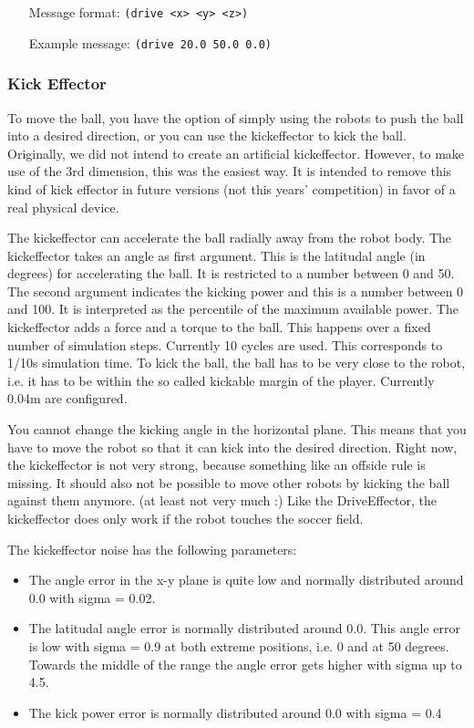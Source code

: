 \begin{itemize}
	\item[Message format:] \texttt{(drive <x> <y> <z>)}
	\item[Example message:] \texttt{(drive 20.0 50.0 0.0)}
\end{itemize}

\subsubsection{Kick Effector}
\label{sec:kickeffector}

To move the ball, you have the option of simply using the robots to
push the ball into a desired direction, or you can use the
kickeffector to kick the ball. Originally, we did not intend to create
an artificial kickeffector. However, to make use of the 3rd dimension,
this was the easiest way. It is intended to remove this kind of kick
effector in future versions (not this years' competition) in favor of
a real physical device.

The kickeffector can accelerate the ball radially away from the robot
body. The kickeffector takes an angle as first argument. This is the
latitudal angle (in degrees) for accelerating the ball. It is
restricted to a number between 0 and 50. The second argument indicates
the kicking power and this is a number between 0 and 100. It is
interpreted as the percentile of the maximum available power. The
kickeffector adds a force and a torque to the ball. This happens over
a fixed number of simulation steps. Currently 10 cycles are used. This
corresponds to 1/10s simulation time. To kick the ball, the ball has
to be very close to the robot, i.e. it has to be within the so called
kickable margin of the player. Currently 0.04m are configured.

You cannot change the kicking angle in the horizontal plane. This
means that you have to move the robot so that it can kick into the
desired direction. Right now, the kickeffector is not very strong,
because something like an offside rule is missing. It should also not
be possible to move other robots by kicking the ball against them
anymore. (at least not very much :) Like the DriveEffector, the
kickeffector does only work if the robot touches the soccer field.

The kickeffector noise has the following parameters: 
\begin{itemize}
\item The angle error in the x-y plane is quite low and normally distributed
around 0.0 with sigma = 0.02.
\item The latitudal angle error is normally distributed around 0.0. This
angle error is low with sigma = 0.9 at both extreme positions, i.e. 0
and at 50 degrees. Towards the middle of the range the angle error
gets higher with sigma up to 4.5.
\item The kick power error is normally distributed around 0.0 with sigma =
0.4
\end{itemize}

